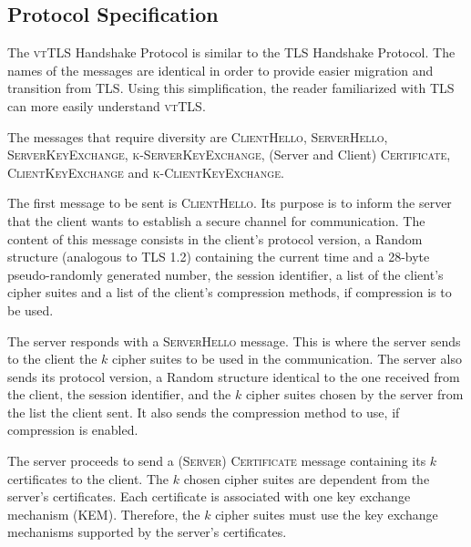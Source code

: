 \documentclass{sig-alternate-05-2015}
\newcommand{\msg}[1]{\textsc{{#1}}}
\begin{document}



\subsection{Protocol Specification}

The \textsc{vtTLS} Handshake Protocol is similar to the TLS Handshake Protocol. The names of the messages are identical in order to provide easier migration and transition from TLS.
Using this simplification, the reader familiarized with TLS can more easily understand \textsc{vtTLS}.

The messages that require diversity  are \msg{ClientHello}, \msg{ServerHello}, \msg{ServerKeyExchange}, \msg{k-ServerKey\-Ex\-change}, (Server and Client) \msg{Certificate}, \msg{ClientKeyExchange} and \msg{k-ClientKeyExchange}.

The first message to be sent is  \msg{ClientHello}. Its purpose is to inform the server that the client wants to establish a  secure channel for communication. The content of this message consists in the client's protocol version, a Random structure (analogous to TLS 1.2) containing the current time and a 28-byte pseudo-randomly generated number, the session identifier, a list of the client's cipher suites and a list of the client's compression methods, if compression is to be used.

The server responds with a  \msg{ServerHello} message. This is where the server sends to the client the $k$ cipher suites to be used in the communication. The server also sends its protocol version, a Random structure identical to the one received from the client, the session identifier, and the $k$ cipher suites chosen by the server from the list the client sent. It  also sends the compression method to use, if compression is %
enabled.

The server proceeds to send a \msg{(Server) Certificate} message containing its $k$ certificates to the client. The $k$ chosen cipher suites are dependent from the server's certificates. Each certificate is associated with one key exchange mechanism (KEM). Therefore, the $k$ cipher suites must use the key exchange mechanisms supported by the server's certificates.
\end{document}
